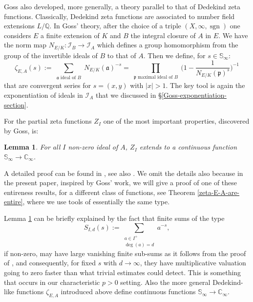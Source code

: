 \documentclass[11pt]{amsart}
\numberwithin{equation}{section}
\newcommand{\CC}{\mathbb{C}}
\newcommand{\QQ}{\mathbb{Q}}
\newcommand{\sgn}{\operatorname{sgn}}
\newtheorem{Lemma}[Theorem]{Lemma}
\begin{document}
Goss also developed, more generally, a theory parallel to that of Dedekind zeta functions. Classically, Dedekind zeta functions are associated to
number field extensions $L/\QQ$. In Goss' theory, after the choice of a triple $(X,\infty,\sgn)$ one considers $E$ a finite extension of $K$ and $B$ the integral closure of $A$ in $E$. 
We have the norm map $N_{E/K}:\mathcal{I}_B\rightarrow\mathcal{I}_A$ which defines a group homomorphism from the 
group of the invertible ideals of $B$ to that of $A$. Then we define, for $s\in\mathbb{S}_\infty$:
$$\zeta_{E,A}(s):=\sum_{\begin{smallmatrix}\mathfrak{a}
\text{ ideal of }B\end{smallmatrix}}N_{E/K}(\mathfrak{a})^{-s}=\prod_{\begin{smallmatrix}\mathfrak{p}
\text{ maximal ideal of }B\end{smallmatrix}}\Big(1-\frac{1}{N_{E/K}(\mathfrak{p})^{s}}\Big)^{-1}$$
that are convergent series for $s=(x,y)$ with $|x|>1$. The key tool is again the exponentiation of ideals in $\mathcal{I}_A$ that we discussed in \S \ref{Goss-exponentiation-section}.

For the partial zeta functions $Z_I$ one of the most important properties, discovered by Goss, is:

\begin{Lemma}\label{analytic-extension-goss}
For all $I$ non-zero ideal of $A$, $Z_I$
extends to a continuous function $\mathbb{S}_\infty\rightarrow\CC_\infty$.
\end{Lemma} 
A detailed proof can be found in \cite{GOS}, see also \cite{THA0}. We omit the details also because in the present paper, inspired by Goss' work, we will give a proof of one of
these entireness results, for a different class of functions, see Theorem \ref{zeta-E-A-are-entire}, where we use tools of essentially the same type.

Lemma \ref{analytic-extension-goss} can be briefly explained by the fact that finite sums of the type
$$S_{I,d}(s):=\sum_{\begin{smallmatrix}a\in I^+\\ \deg(a)=d\end{smallmatrix}}a^{-s},$$ if non-zero,
may have large vanishing finite sub-sums as it follows from the proof of \cite[Theorem 8.9.2]{GOS}, and consequently, for fixed
$s$ with $d\rightarrow\infty$, they have multiplicative valuation going to zero faster than what trivial estimates could detect. This is something that occurs in our characteristic $p>0$ setting. Also the more general Dedekind-like
functions $\zeta_{E,A}$ introduced above define continuous functions $\mathbb{S}_\infty\rightarrow\CC_\infty$.
\end{document}
